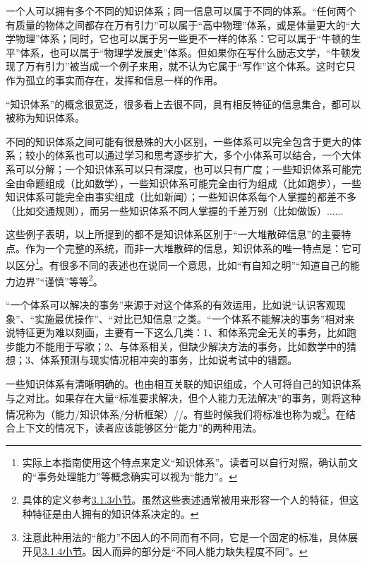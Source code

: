 \begin{examples}
一个人可以拥有多个不同的知识体系；同一信息可以属于不同的体系。“任何两个有质量的物体之间都存在万有引力”可以属于“高中物理”体系，或是体量更大的“大学物理”体系；同时，它也可以属于另一些更不一样的体系：它可以属于“牛顿的生平”体系，也可以属于“物理学发展史”体系。但如果你在写什么励志文学，“牛顿发现了万有引力”被当成一个例子来用，就不认为它属于“写作”这个体系。这时它只作为孤立的事实而存在，发挥和信息一样的作用。
\end{examples}
“知识体系”的概念很宽泛，很多看上去很不同，具有相反特征的信息集合，都可以被称为知识体系。
\begin{examples}
不同的知识体系之间可能有很悬殊的大小区别，一些体系可以完全包含于更大的体系；较小的体系也可以通过学习和思考逐步扩大，多个小体系可以结合，一个大体系可以分解；一个知识体系可以只有深度，也可以只有广度；一些知识体系可能完全由命题组成（比如数学），一些知识体系可能完全由行为组成（比如跑步），一些知识体系可能完全由事实组成（比如新闻）；一些知识体系每个人掌握的都差不多（比如交通规则），而另一些知识体系不同人掌握的千差万别（比如做饭）......
\end{examples}
这些例子表明，以上所提到的都不是知识体系区别于“一大堆散碎信息”的主要特点。作为一个完整的系统，而非一大堆散碎的信息，知识体系的唯一特点是：它可以区分\footnote{实际上本指南使用这个特点来定义“知识体系”\label{para:知识体系}。读者可以自行对照，确认前文的“事务处理能力”等概念确实可以视为“能力”。}。有很多不同的表述也在说同一个意思，比如“有自知之明”“知道自己的能力边界”“谨慎”等等\footnote{具体的定义参考\hyperref[def:能力边界]{3.1.3小节}。虽然这些表述通常被用来形容一个人的特征，但这种特征是由人拥有的知识体系决定的。}。
\begin{examples}
“一个体系可以解决的事务”来源于对这个体系的有效运用，比如说“认识客观现象”、“实施最优操作”、“对比已知信息”之类。“一个体系不能解决的事务”相对来说特征更为难以刻画，主要有一下这么几类：1、和体系完全无关的事务，比如跑步能力不能用于写歌；2、与体系相关，但缺少解决方法的事务，比如数学中的猜想；3、体系预测与现实情况相冲突的事务，比如说考试中的错题。
\end{examples}
一些知识体系有清晰明确的。也由相互关联的知识组成，个人可将自己的知识体系与之对比。如果存在大量“标准要求解决，但个人能力无法解决”的事务，则将这种情况称为（能力/知识体系/分析框架）//。有些时候我们将标准也称为或\footnote{注意此种用法的“能力”不因人的不同而有不同，它是一个固定的标准，具体展开见\hyperref[def:知识体系]{3.1.4小节}。因人而异的部分是“不同人能力缺失程度不同”。}。在结合上下文的情况下，读者应该能够区分“能力”的两种用法。

